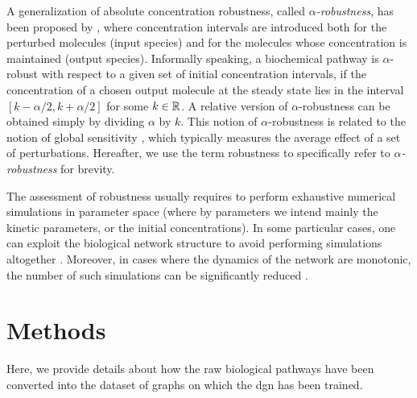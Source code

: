 A generalization of absolute concentration robustness, called \emph{$\alpha$-robustness}, has been proposed by \citet{nasti2018formalizing}, where concentration intervals are introduced both for the perturbed molecules (input species) and for the molecules whose concentration is maintained (output species). Informally speaking, a biochemical pathway is $\alpha$-robust with respect to a given set of initial concentration intervals, if the concentration of a chosen output molecule at the steady state lies in the interval $[k-\alpha/2,k+\alpha/2]$ for some $k \in \mathbb{R}$. A relative version of $\alpha$-robustness can be obtained simply by dividing $\alpha$ by $k$. This notion of $\alpha$-robustness is related to the notion of global sensitivity \citep{zi2011sensitivity}, which typically measures the average effect of a set of perturbations. Hereafter, we use the term robustness to specifically refer to \emph{$\alpha$-robustness} for brevity.

The assessment of robustness usually requires to perform exhaustive numerical simulations in parameter space \citep{rizk2009general,iooss2015review} (where by parameters we intend mainly the kinetic parameters, or the initial concentrations). In some particular cases, one can exploit the biological network structure to avoid performing simulations altogether \citep{shinar2010structural}. Moreover, in cases where the dynamics of the network are monotonic, the number of such simulations can be significantly reduced \citep{gori2019towards}.

\section{Methods}
Here, we provide details about how the raw biological pathways have been converted into the dataset of graphs on which the \gls{dgn} has been trained.

